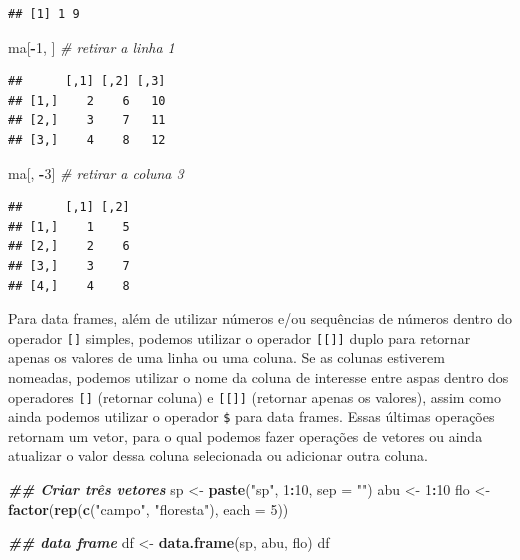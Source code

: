 \documentclass[
]{article}
\newenvironment{Shaded}{\begin{snugshade}}{\end{snugshade}}
\newcommand{\AttributeTok}[1]{\textcolor[rgb]{0.13,0.29,0.53}{#1}}
\newcommand{\CommentTok}[1]{\textcolor[rgb]{0.56,0.35,0.01}{\textit{#1}}}
\newcommand{\DecValTok}[1]{\textcolor[rgb]{0.00,0.00,0.81}{#1}}
\newcommand{\DocumentationTok}[1]{\textcolor[rgb]{0.56,0.35,0.01}{\textbf{\textit{#1}}}}
\newcommand{\FunctionTok}[1]{\textcolor[rgb]{0.13,0.29,0.53}{\textbf{#1}}}
\newcommand{\NormalTok}[1]{#1}
\newcommand{\OtherTok}[1]{\textcolor[rgb]{0.56,0.35,0.01}{#1}}
\newcommand{\SpecialCharTok}[1]{\textcolor[rgb]{0.81,0.36,0.00}{\textbf{#1}}}
\newcommand{\StringTok}[1]{\textcolor[rgb]{0.31,0.60,0.02}{#1}}
\begin{document}
\begin{verbatim}
## [1] 1 9
\end{verbatim}

\begin{Shaded}
\begin{Highlighting}[]
\NormalTok{ma[}\SpecialCharTok{{-}}\DecValTok{1}\NormalTok{, ] }\CommentTok{\# retirar a linha 1}
\end{Highlighting}
\end{Shaded}

\begin{verbatim}
##      [,1] [,2] [,3]
## [1,]    2    6   10
## [2,]    3    7   11
## [3,]    4    8   12
\end{verbatim}

\begin{Shaded}
\begin{Highlighting}[]
\NormalTok{ma[, }\SpecialCharTok{{-}}\DecValTok{3}\NormalTok{] }\CommentTok{\# retirar a coluna 3}
\end{Highlighting}
\end{Shaded}

\begin{verbatim}
##      [,1] [,2]
## [1,]    1    5
## [2,]    2    6
## [3,]    3    7
## [4,]    4    8
\end{verbatim}

Para data frames, além de utilizar números e/ou sequências de números dentro do operador \texttt{{[}{]}} simples, podemos utilizar o operador \texttt{{[}{[}{]}{]}} duplo para retornar apenas os valores de uma linha ou uma coluna. Se as colunas estiverem nomeadas, podemos utilizar o nome da coluna de interesse entre aspas dentro dos operadores \texttt{{[}{]}} (retornar coluna) e \texttt{{[}{[}{]}{]}} (retornar apenas os valores), assim como ainda podemos utilizar o operador \texttt{\$} para data frames. Essas últimas operações retornam um vetor, para o qual podemos fazer operações de vetores ou ainda atualizar o valor dessa coluna selecionada ou adicionar outra coluna.

\begin{Shaded}
\begin{Highlighting}[]
\DocumentationTok{\#\# Criar três vetores}
\NormalTok{sp }\OtherTok{\textless{}{-}} \FunctionTok{paste}\NormalTok{(}\StringTok{"sp"}\NormalTok{, }\DecValTok{1}\SpecialCharTok{:}\DecValTok{10}\NormalTok{, }\AttributeTok{sep =} \StringTok{""}\NormalTok{)}
\NormalTok{abu }\OtherTok{\textless{}{-}} \DecValTok{1}\SpecialCharTok{:}\DecValTok{10}
\NormalTok{flo }\OtherTok{\textless{}{-}} \FunctionTok{factor}\NormalTok{(}\FunctionTok{rep}\NormalTok{(}\FunctionTok{c}\NormalTok{(}\StringTok{"campo"}\NormalTok{, }\StringTok{"floresta"}\NormalTok{), }\AttributeTok{each =} \DecValTok{5}\NormalTok{))}

\DocumentationTok{\#\# data frame}
\NormalTok{df }\OtherTok{\textless{}{-}} \FunctionTok{data.frame}\NormalTok{(sp, abu, flo)}
\NormalTok{df}
\end{Highlighting}
\end{Shaded}
\end{document}
